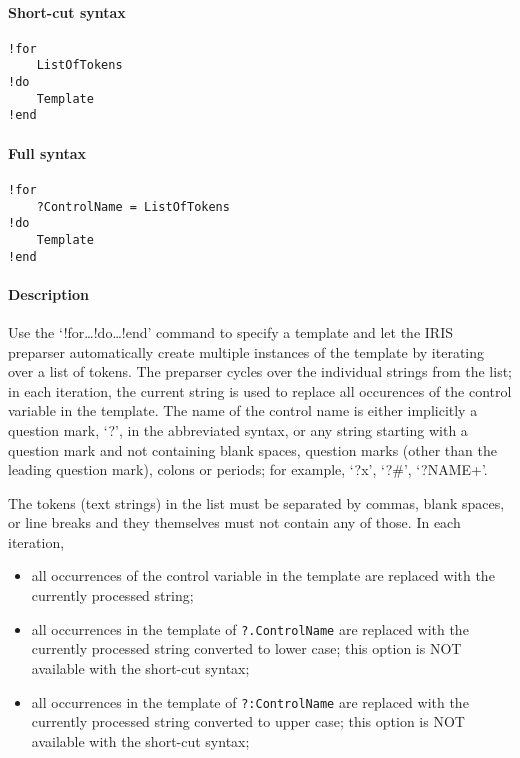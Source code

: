 


	\paragraph{Short-cut syntax}

\begin{verbatim}
!for
    ListOfTokens
!do
    Template
!end
\end{verbatim}

\paragraph{Full syntax}

\begin{verbatim}
!for
    ?ControlName = ListOfTokens
!do
    Template
!end
\end{verbatim}

\paragraph{Description}

Use the `!for\ldots{}!do\ldots{}!end' command to specify a template and
let the IRIS preparser automatically create multiple instances of the
template by iterating over a list of tokens. The preparser cycles over
the individual strings from the list; in each iteration, the current
string is used to replace all occurences of the control variable in the
template. The name of the control name is either implicitly a question
mark, `?', in the abbreviated syntax, or any string starting with a
question mark and not containing blank spaces, question marks (other
than the leading question mark), colons or periods; for example, `?x',
`?\#', `?NAME+'.

The tokens (text strings) in the list must be separated by commas, blank
spaces, or line breaks and they themselves must not contain any of
those. In each iteration,

\begin{itemize}
\item
  all occurrences of the control variable in the template are replaced
  with the currently processed string;
\item
  all occurrences in the template of \texttt{?.ControlName} are replaced
  with the currently processed string converted to lower case; this
  option is NOT available with the short-cut syntax;
\item
  all occurrences in the template of \texttt{?:ControlName} are replaced
  with the currently processed string converted to upper case; this
  option is NOT available with the short-cut syntax;
\end{itemize}

